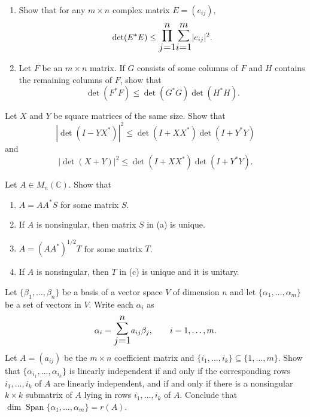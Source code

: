 \documentclass[12pt]{article}
\let\oldsum\sum
\let\oldprod\prod
\renewcommand{\sum}{\mathlarger{\mathlarger{\oldsum}}}
\renewcommand{\prod}{\mathlarger{\mathlarger{\oldprod}}}
\begin{document}
\begin{problem}
\begin{enumerate}[label=(\alph*)]
\item Show that for any $m\times n$ complex matrix $E=(e_{ij})$,
\[
\det(E^*E) \le \prod_{j=1}^n \sum_{i=1}^m |e_{ij}|^2.
\]
\item Let $F$ be an $m\times n$ matrix. If $G$ consists of some columns of $F$ and $H$ contains the remaining columns of $F$, show that
\[
\det(F^*F) \le \det(G^*G)\det(H^*H).
\]
\end{enumerate}
\end{problem}

\begin{problem}
Let $X$ and $Y$ be square matrices of the same size. Show that
\[
|\det(I-YX^*)|^2 \le \det(I+XX^*)\det(I+Y^*Y)
\]
and
\[
|\det(X+Y)|^2 \le \det(I+XX^*)\det(I+Y^*Y).
\]
\end{problem}

\begin{problem}
Let $A\in M_n(\mathbb{C})$. Show that
\begin{enumerate}[label=(\alph*)]
\item $A=AA^*S$ for some matrix $S$.
\item If $A$ is nonsingular, then matrix $S$ in (a) is unique.
\item $A=(AA^*)^{1/2}T$ for some matrix $T$.
\item If $A$ is nonsingular, then $T$ in (c) is unique and it is unitary.
\end{enumerate}
\end{problem}

\begin{problem}
Let $\{\beta_1,\dots,\beta_n\}$ be a basis of a vector space $V$ of dimension $n$ and let $\{\alpha_1,\dots,\alpha_m\}$ be a set of vectors in $V$. Write each $\alpha_i$ as
\[
\alpha_i = \sum_{j=1}^n a_{ij}\beta_j, \qquad i=1,\dots,m.
\]
Let $A=(a_{ij})$ be the $m\times n$ coefficient matrix and $\{i_1,\dots,i_k\}\subseteq\{1,\dots,m\}$. Show that $\{\alpha_{i_1},\dots,\alpha_{i_k}\}$ is linearly independent if and only if the corresponding rows $i_1,\dots,i_k$ of $A$ are linearly independent, and if and only if there is a nonsingular $k\times k$ submatrix of $A$ lying in rows $i_1,\dots,i_k$ of $A$. Conclude that $\dim \operatorname{Span}\{\alpha_1,\dots,\alpha_m\} = r(A)$.
\end{problem}
\end{document}
